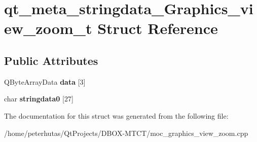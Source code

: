 \hypertarget{structqt__meta__stringdata___graphics__view__zoom__t}{}\section{qt\+\_\+meta\+\_\+stringdata\+\_\+\+Graphics\+\_\+view\+\_\+zoom\+\_\+t Struct Reference}
\label{structqt__meta__stringdata___graphics__view__zoom__t}
\subsection*{Public Attributes}
\begin{DoxyCompactItemize}
\item 
\mbox{\label{structqt__meta__stringdata___graphics__view__zoom__t_a511e468fed017825764284edb23ca070}} 
Q\+Byte\+Array\+Data {\bfseries data} \mbox{[}3\mbox{]}
\item 
\mbox{\label{structqt__meta__stringdata___graphics__view__zoom__t_ae6388d4e95d824b139ca5fdd3a012022}} 
char {\bfseries stringdata0} \mbox{[}27\mbox{]}
\end{DoxyCompactItemize}


The documentation for this struct was generated from the following file\+:\begin{DoxyCompactItemize}
\item 
/home/peterhutas/\+Qt\+Projects/\+D\+B\+O\+X-\/\+M\+T\+C\+T/moc\+\_\+graphics\+\_\+view\+\_\+zoom.\+cpp\end{DoxyCompactItemize}
